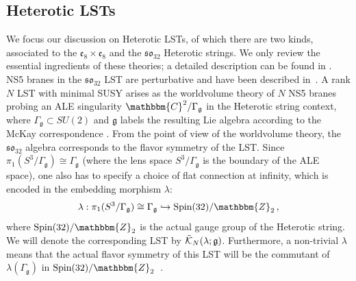 \documentclass[11pt]{article}
\numberwithin{equation}{section}
\newcommand{\fg}{\mathfrak{g}}
\begin{document}
\subsection{Heterotic LSTs}
\label{sec:Horwit}
We focus our discussion on Heterotic LSTs, of which there are two kinds, associated to the $\mathfrak{e}_{8} \times \mathfrak{e}_{8}$ and the $\mathfrak{so}_{32}$ Heterotic strings. We only review the essential ingredients of these theories; a detailed description can be found in \cite{DelZotto:2022ohj}. NS5 branes in the $\mathfrak{so}_{32}$ LST are perturbative and have been described in~\cite{Witten:1995gx}. A rank $N$ LST with minimal SUSY arises as the worldvolume theory of $N$ NS5 branes probing an ALE singularity $\mathbbm{C}^{2}/\Gamma_{\mathfrak{g}}$ in the Heterotic string context, where $\Gamma_{\mathfrak{g}} \subset SU(2)$ and $\mathfrak{g}$ labels the resulting Lie algebra according to the McKay correspondence \cite{Intriligator:1997dh,Blum:1997mm,Blum:1997fw}. From the point of view of the worldvolume theory, the $\mathfrak{so}_{32}$ algebra corresponds to the flavor symmetry of the LST.
Since $\pi_{1}(S^{3}/\Gamma_{\mathfrak{g}}) \cong \Gamma_{\mathfrak{g}}$ (where the lens space $S^{3}/\Gamma_{\fg}$ is the boundary of the ALE space), one also has to specify a choice of flat connection at infinity, which is encoded in the embedding morphism $\mathfrak{\lambda}$:
\begin{align}
\label{eq:flatcons}
\lambda: \pi_{1}(S^{3}/\Gamma_{\mathfrak{g}}) \cong \Gamma_{\mathfrak{g}} \hookrightarrow \text{Spin}(32)/\mathbbm{Z}_{2}\,,
\end{align}
where $\text{Spin}(32)/\mathbbm{Z}_{2}$ is the actual gauge group of the Heterotic string. We will denote the corresponding LST by $\mathcal{\Tilde{K}}_{N}(\lambda;\mathfrak{g})$. Furthermore, a non-trivial $\lambda$ means that the actual flavor symmetry of this LST will be the commutant of $\lambda(\Gamma_{\mathfrak{g}})$ in $\text{Spin}(32)/\mathbbm{Z}_{2}$~\cite{Blum:1997fw,Blum:1997mm,Intriligator:1997dh,Intriligator:1997pq,Brunner:1997gf}. 
\end{document}

